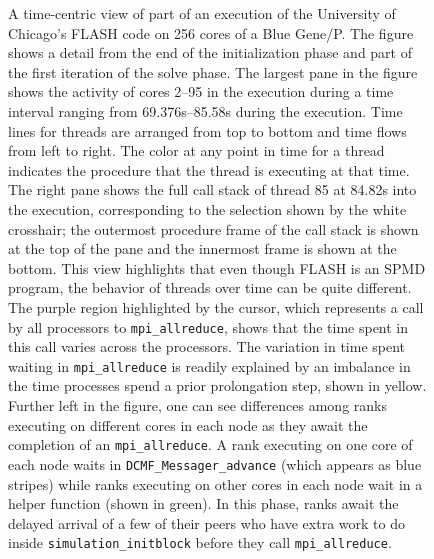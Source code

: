 \documentclass[11pt,letterpaper]{report}
\begin{document}
\begin{figure}[t]
\caption{A time-centric view of  part of an execution of the University of Chicago's FLASH code  on 256 cores of a Blue Gene/P. The figure shows a detail from the end of the initialization phase and  part of the first iteration of the solve phase. The largest pane in the figure shows the activity of cores 2--95 in the execution during a time interval ranging from 69.376s--85.58s during the execution.  Time lines for threads are arranged from top to bottom and time flows from left to right. The color at any point in time for a thread indicates the procedure that the thread is executing at that time. The right pane shows the full call stack of thread 85 at 84.82s into the execution, corresponding to the selection shown by the white crosshair; the outermost procedure frame of the call stack is shown at the top of the pane and the innermost frame is shown at the bottom. This view highlights that even though FLASH is an SPMD program, the behavior of threads over time can be quite different. The purple region highlighted by the cursor, which represents a call by all processors to {\tt mpi\_allreduce}, shows that the time spent in this call varies across the processors. The variation in time spent waiting in {\tt mpi\_allreduce} is readily explained by an imbalance in the time processes spend a prior prolongation step, shown in yellow. Further left in the figure, one can see differences among ranks executing on different cores in each node as they await the  completion of an {\tt mpi\_allreduce}. A rank executing on one core of each node waits in {\tt DCMF\_Messager\_advance} (which appears as blue stripes) while ranks executing on other cores in each node wait in a helper function (shown in green). In this phase, ranks await the delayed arrival of a few of their peers who have extra work to do inside {\tt simulation\_initblock} before they call  {\tt mpi\_allreduce}. }
\label{fig:time-centric}
\end{figure}
\end{document}
